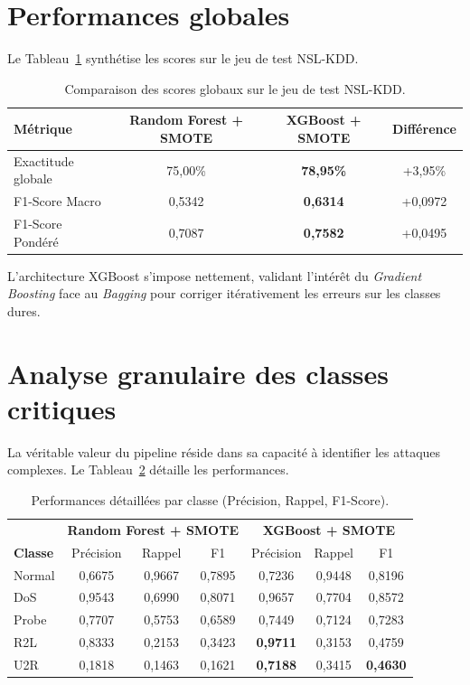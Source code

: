 \documentclass[12pt,a4paper]{report}
\begin{document}
\section{Performances globales}

Le Tableau~\ref{tab:resultats-globaux} synthétise les scores sur le jeu de test NSL-KDD.

\begin{table}[H]
    \centering
    \begin{tabular}{lccc}
        \toprule
        \textbf{Métrique} & \textbf{Random Forest + SMOTE} & \textbf{XGBoost + SMOTE} & \textbf{Différence} \\
        \midrule
        Exactitude globale & 75,00\% & \textbf{78,95\%} & +3,95\% \\
        F1-Score Macro & 0,5342 & \textbf{0,6314} & +0,0972 \\
        F1-Score Pondéré & 0,7087 & \textbf{0,7582} & +0,0495 \\
        \bottomrule
    \end{tabular}
    \caption{Comparaison des scores globaux sur le jeu de test NSL-KDD.}
    \label{tab:resultats-globaux}
\end{table}

L'architecture XGBoost s'impose nettement, validant l'intérêt du \textit{Gradient Boosting} face au \textit{Bagging} pour corriger itérativement les erreurs sur les classes dures.

\section{Analyse granulaire des classes critiques}

La véritable valeur du pipeline réside dans sa capacité à identifier les attaques complexes. Le Tableau~\ref{tab:resultats-classe} détaille les performances.

\begin{table}[H]
    \centering
    \begin{tabular}{l|ccc|ccc}
        \toprule
        & \multicolumn{3}{c|}{\textbf{Random Forest + SMOTE}} & \multicolumn{3}{c}{\textbf{XGBoost + SMOTE}} \\
        \textbf{Classe} & Précision & Rappel & F1 & Précision & Rappel & F1 \\
        \midrule
        Normal & 0,6675 & 0,9667 & 0,7895 & 0,7236 & 0,9448 & 0,8196 \\
        DoS & 0,9543 & 0,6990 & 0,8071 & 0,9657 & 0,7704 & 0,8572 \\
        Probe & 0,7707 & 0,5753 & 0,6589 & 0,7449 & 0,7124 & 0,7283 \\
        R2L & 0,8333 & 0,2153 & 0,3423 & \textbf{0,9711} & 0,3153 & 0,4759 \\
        U2R & 0,1818 & 0,1463 & 0,1621 & \textbf{0,7188} & 0,3415 & \textbf{0,4630} \\
        \bottomrule
    \end{tabular}
    \caption{Performances détaillées par classe (Précision, Rappel, F1-Score).}
    \label{tab:resultats-classe}
\end{table}
\end{document}
